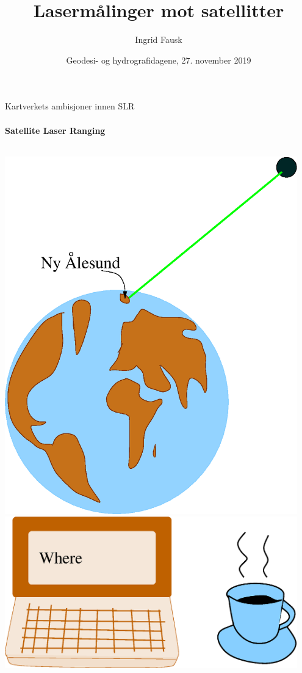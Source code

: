 \documentclass[12pt,table,t]{beamer}
\title{Lasermålinger mot satellitter}
\subtitle{}
\author{Ingrid Fausk}
\date{Geodesi- og hydrografidagene, 27. november 2019}
\begin{document}
\frame[plain]{\titlepage}

\begin{frame}{Kartverkets ambisjoner innen SLR}
  \framesubtitle{Satellite Laser Ranging}
  \vspace{0.7cm}
  \begin{columns}
      \includegraphics[width=0.95\textwidth]{figure/jordklode.eps}
      \includegraphics[width=0.95\textwidth]{figure/where.eps}
  \end{columns}
\end{frame}
\end{document}
